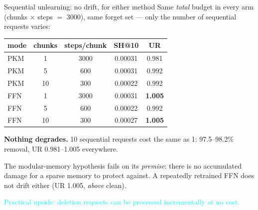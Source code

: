 \documentclass{beamer}
\newcommand{\pierre}[1]{\textcolor{cyan}{#1}}
\begin{document}
\begin{frame}{Sequential unlearning: no drift, for either method}
Same \emph{total} budget in every arm (chunks $\times$ steps $=$ 3000), same
forget set --- only the number of sequential requests varies:
\begin{center}
\begin{tabular}{|l|c|c|c|c|}
\hline
mode & chunks & steps/chunk & SH@10 & UR \\
\hline
PKM & 1  & 3000 & 0.00031 & 0.981 \\
PKM & 5  & 600  & 0.00031 & 0.992 \\
PKM & 10 & 300  & 0.00022 & 0.992 \\
FFN & 1  & 3000 & 0.00031 & \textbf{1.005} \\
FFN & 5  & 600  & 0.00022 & 0.992 \\
FFN & 10 & 300  & 0.00027 & \textbf{1.005} \\
\hline
\end{tabular}
\end{center}

\textbf{Nothing degrades.} 10 sequential requests cost the same as 1:
97.5--98.2\% removal, UR 0.981--1.005 everywhere.

\medskip
\alert{The modular-memory hypothesis fails on its \emph{premise}:} there is no
accumulated damage for a sparse memory to protect against. A repeatedly
retrained FFN does not drift either (UR 1.005, \emph{above} clean).

\medskip
\pierre{Practical upside: deletion requests can be processed incrementally at no
cost.}
\end{frame}
\end{document}

